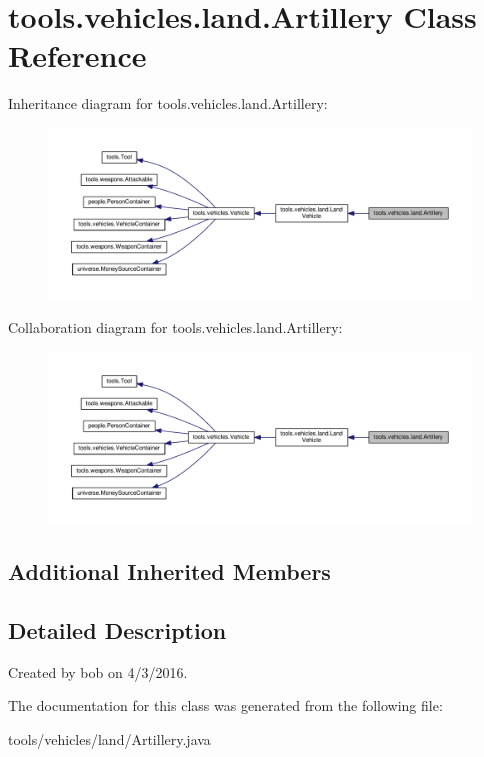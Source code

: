 \hypertarget{classtools_1_1vehicles_1_1land_1_1_artillery}{}\section{tools.\+vehicles.\+land.\+Artillery Class Reference}
\label{classtools_1_1vehicles_1_1land_1_1_artillery}


Inheritance diagram for tools.\+vehicles.\+land.\+Artillery\+:\nopagebreak
\begin{figure}[H]
\begin{center}
\leavevmode
\includegraphics[width=350pt]{classtools_1_1vehicles_1_1land_1_1_artillery__inherit__graph}
\end{center}
\end{figure}


Collaboration diagram for tools.\+vehicles.\+land.\+Artillery\+:\nopagebreak
\begin{figure}[H]
\begin{center}
\leavevmode
\includegraphics[width=350pt]{classtools_1_1vehicles_1_1land_1_1_artillery__coll__graph}
\end{center}
\end{figure}
\subsection*{Additional Inherited Members}


\subsection{Detailed Description}
Created by bob on 4/3/2016. 

The documentation for this class was generated from the following file\+:\begin{DoxyCompactItemize}
\item 
tools/vehicles/land/Artillery.\+java\end{DoxyCompactItemize}
